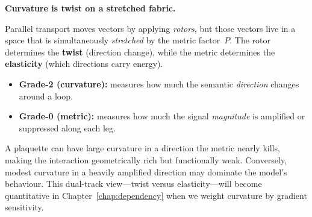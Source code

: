 \documentclass[11pt, twoside, openright]{memoir}
\numberwithin{equation}{chapter}
\begin{document}
\begin{pitfall}
\textbf{Curvature is twist on a stretched fabric.}

Parallel transport moves vectors by applying \emph{rotors}, but those
vectors live in a space that is simultaneously \emph{stretched} by
the metric factor~$P$.  The rotor determines the \textbf{twist}
(direction change), while the metric determines the
\textbf{elasticity} (which directions carry energy).

\begin{itemize}[nosep]
\item \textbf{Grade-2 (curvature):} measures how much the semantic
  \emph{direction} changes around a loop.
\item \textbf{Grade-0 (metric):} measures how much the signal
  \emph{magnitude} is amplified or suppressed along each leg.
\end{itemize}

A plaquette can have large curvature in a direction the metric nearly
kills, making the interaction geometrically rich but functionally
weak.  Conversely, modest curvature in a heavily amplified direction
may dominate the model's behaviour.  This dual-track view---twist
versus elasticity---will become quantitative in
Chapter~\ref{chap:dependency} when we weight curvature by gradient
sensitivity.
\end{pitfall}
\end{document}
